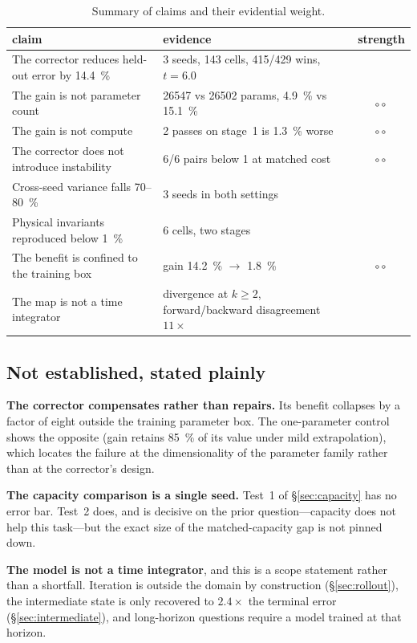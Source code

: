 ﻿\documentclass[11pt,a4paper]{article}
\newcommand{\strong}{\textcolor{green!35!black}{\textbullet\!\textbullet\!\textbullet}}
\newcommand{\weak}{\textcolor{red!65!black}{\textbullet$\circ\circ$}}
\begin{document}
\begin{table}[h]
\centering\small
\begin{tabular}{@{}p{}p{}c@{}}
\toprule
claim & evidence & strength \\
\midrule
The corrector reduces held-out error by \SI{14.4}{\percent} &
3 seeds, 143 cells, 415/429 wins, $t=6.0$ & \strong \\
The gain is not parameter count &
\num{26547} vs \num{26502} params, \SI{4.9}{\percent} vs \SI{15.1}{\percent} & \weak \\
The gain is not compute & 2 passes on stage~1 is \SI{1.3}{\percent} worse & \weak \\
The corrector does not introduce instability & 6/6 pairs below 1 at matched cost & \weak \\
Cross-seed variance falls \SI{70}{}--\SI{80}{\percent} & 3 seeds in both settings & \strong \\
Physical invariants reproduced below \SI{1}{\percent} & 6 cells, two stages & \strong \\
The benefit is confined to the training box & gain \SI{14.2}{\percent} $\to$ \SI{1.8}{\percent}
  & \weak \\
The map is not a time integrator &
divergence at $k\ge2$, forward/backward disagreement $11\times$ & \strong \\
\bottomrule
\end{tabular}
\caption{Summary of claims and their evidential weight.}
\end{table}

\subsection{Not established, stated plainly}

\textbf{The corrector compensates rather than repairs.} Its benefit collapses by a factor of
eight outside the training parameter box. The one-parameter control shows the opposite (gain
retains \SI{85}{\percent} of its value under mild extrapolation), which locates the failure at
the dimensionality of the parameter family rather than at the corrector's design.

\textbf{The capacity comparison is a single seed.} Test~1 of \S\ref{sec:capacity} has no error
bar. Test~2 does, and is decisive on the prior question---capacity does not help this task---but
the exact size of the matched-capacity gap is not pinned down.

\textbf{The model is not a time integrator}, and this is a scope statement rather than a
shortfall. Iteration is outside the domain by construction (\S\ref{sec:rollout}), the
intermediate state is only recovered to $2.4\times$ the terminal error
(\S\ref{sec:intermediate}), and long-horizon questions require a model trained at that horizon.
\end{document}
